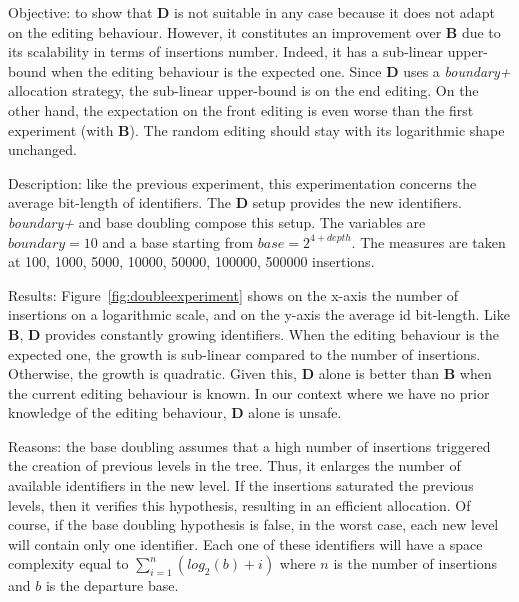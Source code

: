 \begin{asparadesc}
\item[Objective:] to show that \textbf{D} is not suitable in any case because
  it does not adapt on the editing behaviour.  However, it constitutes an
  improvement over \textbf{B} due to its scalability in terms of insertions
  number.  Indeed, it has a sub-linear upper-bound when the editing behaviour
  is the expected one. Since \textbf{D} uses a \emph{boundary+} allocation
  strategy, the sub-linear upper-bound is on the end editing. On the other
  hand, the expectation on the front editing is even worse than the first
  experiment (with \textbf{B}). The random editing should stay with its
  logarithmic shape unchanged.

\item[Description:] like the previous experiment, this experimentation concerns
  the average bit-length of identifiers. The \textbf{D} setup provides the new
  identifiers.  \emph{boundary+} and base doubling compose this setup. The
  variables are $boundary=10$ and a base starting from $base=2^{4+depth}$. The
  measures are taken at 100, 1000, 5000, 10000, 50000, 100000, 500000
  insertions.

\item[Results:] Figure~\ref{fig:doubleexperiment} shows on the x-axis the
  number of insertions on a logarithmic scale, and on the y-axis the average id
  bit-length. Like \textbf{B}, \textbf{D} provides constantly growing
  identifiers. When the editing behaviour is the expected one, the growth is
  sub-linear compared to the number of insertions. Otherwise, the growth is
  quadratic. Given this, \textbf{D} alone is better than \textbf{B} when the
  current editing behaviour is known. In our context where we have no prior
  knowledge of the editing behaviour, \textbf{D} alone is unsafe.

\item[Reasons:] the base doubling assumes that a high number of insertions
  triggered the creation of previous levels in the tree. Thus, it enlarges the
  number of available identifiers in the new level. If the insertions saturated
  the previous levels, then it verifies this hypothesis, resulting in an
  efficient allocation. Of course, if the base doubling hypothesis is false, in
  the worst case, each new level will contain only one identifier. Each one of
  these identifiers will have a space complexity equal to
  $\sum\limits_{i=1}^{n}{(log_2(b) + i)}$ where $n$ is the number of insertions
  and $b$ is the departure base.
\end{asparadesc}

